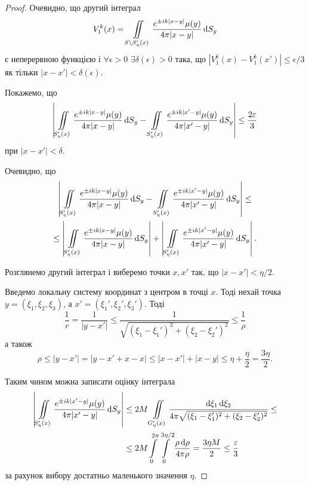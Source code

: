 \begin{proof}
	Очевидно, що другий інтеграл
	\begin{equation}
		V_1^k(x) = \displaystyle\iint\limits_{S \setminus S_\eta'(x)} \frac{e^{\pm i k |x - y|} \mu(y)}{4 \pi |x - y|} \mathop{}\!\mathrm{d} S_y
	\end{equation}
	є неперервною функцією і $\forall \epsilon > 0$ $\exists \delta(\epsilon) > 0$ така, що $|V_1^k(x) - V_1^k(x')| \le \epsilon/3$ як тільки $|x - x'| < \delta(\epsilon)$. \medskip

	Покажемо, що
	\begin{equation}
		\left| \displaystyle\iint\limits_{S_\eta'(x)} \frac{e^{\pm i k |x - y|} \mu(y)}{4 \pi |x - y|} \mathop{}\!\mathrm{d} S_y -  \displaystyle\iint\limits_{S_\eta'(x)} \frac{e^{\pm i k |x' - y|} \mu(y)}{4 \pi |x' - y|} \mathop{}\!\mathrm{d} S_y \right| \le \frac{2 \varepsilon}{3}
	\end{equation}
	при $|x - x'| < \delta$. \medskip

	Очевидно, що
	\begin{multline}
		\left| \displaystyle\iint\limits_{S_\eta'(x)} \frac{e^{\pm i k |x - y|} \mu(y)}{4 \pi |x - y|} \mathop{}\!\mathrm{d} S_y -  \displaystyle\iint\limits_{S_\eta'(x)} \frac{e^{\pm i k |x' - y|} \mu(y)}{4 \pi |x' - y|} \mathop{}\!\mathrm{d} S_y \right| \le \\
		\le \left| \displaystyle\iint\limits_{S_\eta'(x)} \frac{e^{\pm i k |x - y|} \mu(y)}{4 \pi |x - y|} \mathop{}\!\mathrm{d} S_y \right| + \left| \displaystyle\iint\limits_{S_\eta'(x)} \frac{e^{\pm i k |x' - y|} \mu(y)}{4 \pi |x' - y|} \mathop{}\!\mathrm{d} S_y \right|.
	\end{multline}

	Розглянемо другий інтеграл і виберемо точки $x, x'$ так, що $|x - x'| < \eta / 2$. \medskip

	Введемо локальну систему координат з центром в точці $x$. Тоді нехай точка $y = (\xi_1, \xi_2, \xi_3)$, а $x' = (\xi_1', \xi_2', \xi_3')$. Тоді 
	\begin{equation}
		\frac{1}{r} = \frac{1}{|y - x'|} \le \frac{1}{\sqrt{(\xi_1 - \xi_1')^2 + (\xi_2 - \xi_2')^2}} \le \frac{1}{\rho}
	\end{equation}
	а також
	\begin{equation}
		\rho \le |y - x'| = |y - x' + x - x| \le |x - x'| + |x - y| \le \eta + \frac{\eta}{2} = \frac{3 \eta}{2}.
	\end{equation}
 
	Таким чином можна записати оцінку інтеграла
	\begin{equation}
		\begin{aligned}
			\left| \displaystyle\iint\limits_{S_\eta'(x)} \frac{e^{\pm i k |x' - y|} \mu(y)}{4 \pi |x' - y|} \mathop{}\!\mathrm{d} S_y \right| &\le 2 M \displaystyle\iint\limits_{G_\eta'(x)} \frac{\mathop{}\!\mathrm{d} \xi_1 \mathop{}\!\mathrm{d} \xi_2}{4 \pi \sqrt{(\xi_1 - \xi_1')^2 + (\xi_2 - \xi_2')^2}} \le \\
			&\le 2M \displaystyle\int\limits_0^{2\pi} \displaystyle\int\limits_0^{3\eta/2} \frac{\rho \mathop{}\!\mathrm{d} \rho}{4 \pi \rho} = \frac{3 \eta M}{2} \le \frac{\varepsilon}{3}
		\end{aligned}
	\end{equation}
	за рахунок вибору достатньо маленького значення $\eta$. \medskip


\end{proof}
